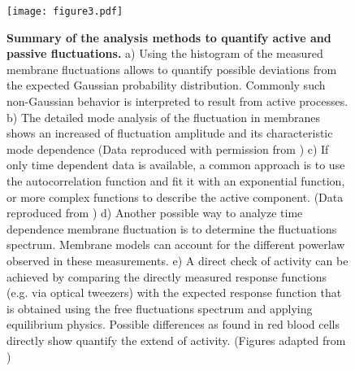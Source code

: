 \documentclass[graybox]{svmult}
\begin{document}
\begin{figure}
	\centering
		\texttt{[image: figure3.pdf]}
	\caption{\textbf{Summary of the analysis methods to quantify active and passive fluctuations.} a) Using the histogram of the measured membrane fluctuations allows to quantify possible deviations from the expected Gaussian probability distribution. Commonly such non-Gaussian behavior is interpreted to result from active processes. b) The detailed mode analysis of the fluctuation in membranes shows an increased of fluctuation amplitude and its characteristic mode dependence (Data reproduced with permission from \cite{Faris:2009}) c) If only time dependent data is available, a common approach is to use the autocorrelation function and fit it with an exponential function, or more complex functions to describe the active component. (Data reproduced from \cite{Monzel:2015}) d) Another possible way to analyze time dependence membrane fluctuation is to determine the fluctuations spectrum. Membrane models can account for the different powerlaw observed in these measurements. e) A direct check of activity can be achieved by comparing the directly measured response functions (e.g. via optical tweezers) with the expected response function that is obtained using the free fluctuations spectrum and applying equilibrium physics. Possible differences as found in red blood cells directly show quantify the extend of activity. (Figures adapted from \cite{Turlier:2016})    }
	\label{fig:fig3}
\end{figure}
%
\end{document}
